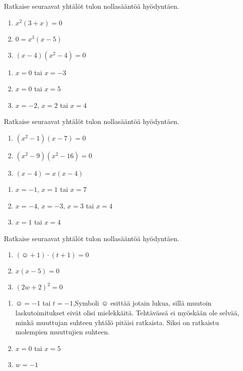\begin{tehtava}
    Ratkaise seuraavat yhtälöt tulon nollasääntöä hyödyntäen.
    \begin{enumerate}
        \item $x^2(3+x)=0$
        \item $0=x^3(x-5)$
        \item $(x-4)(x^2-4)=0$
    \end{enumerate}
    \begin{vastaus}
        \begin{enumerate}
            \item $x=0$ tai $x=-3$
            \item $x=0$ tai $x=5$
            \item $x=-2$, $x=2$ tai $x=4$
        \end{enumerate}
    \end{vastaus}
\end{tehtava}

\begin{tehtava}
    Ratkaise seuraavat yhtälöt tulon nollasääntöä hyödyntäen.
    \begin{enumerate}
        \item $(x^2-1)(x-7)=0$
        \item $(x^2-9)(x^2-16)=0$
        \item $(x-4)=x(x-4)$
    \end{enumerate}
    \begin{vastaus}
        \begin{enumerate}
            \item $x=-1$, $x=1$ tai $x=7$
            \item $x=-4$, $x=-3$, $x=3$ tai $x=4$
            \item $x=1$ tai $x=4$
        \end{enumerate}
    \end{vastaus}
\end{tehtava}

\begin{tehtava}
    Ratkaise seuraavat yhtälöt tulon nollasääntöä hyödyntäen.
    \begin{enumerate}
        \item $(\smiley{}+1)\cdot (t+1)=0$
        \item $x(x-5)=0$
        \item $(2w+2)^2=0$
    \end{enumerate}
    \begin{vastaus}
        \begin{enumerate}
            \item $\smiley{}=-1$ tai $t=-1$,\qquad  Symboli $\smiley{}$ esittää jotain lukua, sillä muutoin laskutoimitukset eivät olisi mielekkäitä. Tehtävässä ei myöskään ole selvää, minkä muuttujan suhteen yhtälö pitäisi ratkaista. Siksi on ratkaistu molempien muuttujien suhteen.
            \item $x=0$ tai $x=5$
            \item $w=-1$
        \end{enumerate}
    \end{vastaus}
\end{tehtava}


